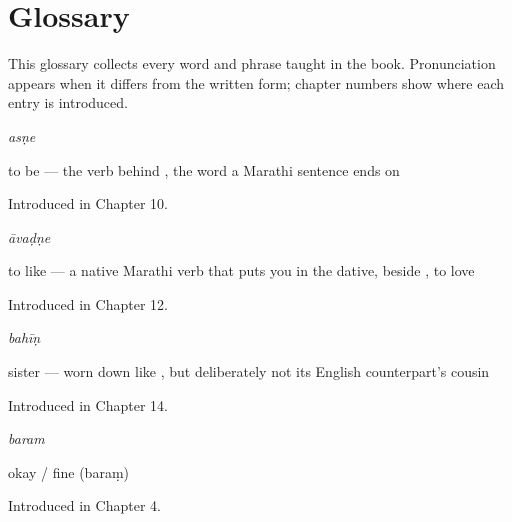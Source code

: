 
\chapter*{Glossary}

This glossary collects every word and phrase taught in the book. Pronunciation appears when it differs from the written form; chapter numbers show where each entry is introduced.

\noindent\begin{minipage}[t]{\linewidth}
\raggedright
\textbf{}\enspace\emph{asṇe}\par
\small to be — the verb behind , the word a Marathi sentence ends on\par
\footnotesize Introduced in Chapter 10.
\end{minipage}\par\medskip

\noindent\begin{minipage}[t]{\linewidth}
\raggedright
\textbf{}\enspace\emph{āvaḍṇe}\par
\small to like — a native Marathi verb that puts you in the dative, beside  , to love\par
\footnotesize Introduced in Chapter 12.
\end{minipage}\par\medskip

\noindent\begin{minipage}[t]{\linewidth}
\raggedright
\textbf{}\enspace\emph{bahīṇ}\par
\small sister — worn down like , but deliberately not its English counterpart's cousin\par
\footnotesize Introduced in Chapter 14.
\end{minipage}\par\medskip

\noindent\begin{minipage}[t]{\linewidth}
\raggedright
\textbf{}\enspace\emph{baram}\par
\small okay / fine (baraṃ)\par
\footnotesize Introduced in Chapter 4.
\end{minipage}\par\medskip

